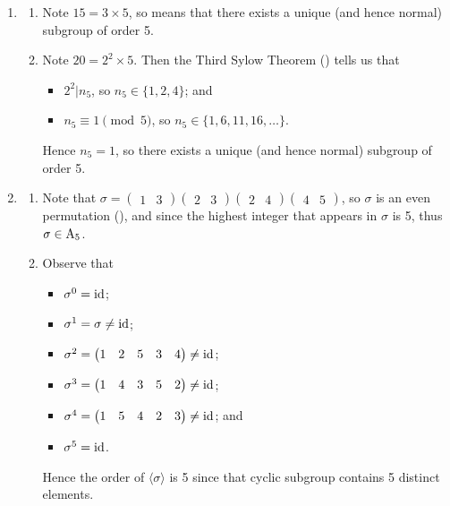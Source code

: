 \begin{enumerate}
    \item \begin{enumerate}[label=(\alph*)]
        \item Note $15 = 3 \times 5$, so  means that there exists a unique (and hence normal) subgroup of order 5.
        \item Note $20 = 2^2 \times 5$. Then the Third Sylow Theorem () tells us that
        \begin{itemize}
            \item $2^2 \vert n_5$, so $n_5 \in \{1, 2, 4\}$; and
            \item $n_5 \equiv 1 \pmod 5$, so $n_5 \in \{1, 6, 11, 16, \dots\}$.
        \end{itemize}
        Hence $n_5 = 1$, so there exists a unique (and hence normal) subgroup of order 5.
    \end{enumerate}

    \item \begin{enumerate}[label=(\alph*)]
        \item Note that $\sigma = \begin{pmatrix}1&3\end{pmatrix}\begin{pmatrix}2&3\end{pmatrix}\begin{pmatrix}2&4\end{pmatrix}\begin{pmatrix}4&5\end{pmatrix}$, so $\sigma$ is an even permutation (), and since the highest integer that appears in $\sigma$ is 5, thus $\sigma \in \mathrm{A}_{5}$.

        \item Observe that
        \begin{itemize}
            \item $\sigma^0 = \mathrm{id}$;
            \item $\sigma^1 = \sigma \neq \mathrm{id}$;
            \item $\sigma^2 = \begin{pmatrix}1&2&5&3&4\end{pmatrix} \neq \mathrm{id}$;
            \item $\sigma^3 = \begin{pmatrix}1&4&3&5&2\end{pmatrix} \neq \mathrm{id}$;
            \item $\sigma^4 = \begin{pmatrix}1&5&4&2&3\end{pmatrix} \neq \mathrm{id}$; and
            \item $\sigma^5 = \mathrm{id}$.
        \end{itemize}
        Hence the order of $\langle \sigma \rangle$ is 5 since that cyclic subgroup contains 5 distinct elements.


\end{enumerate}
\end{enumerate}
